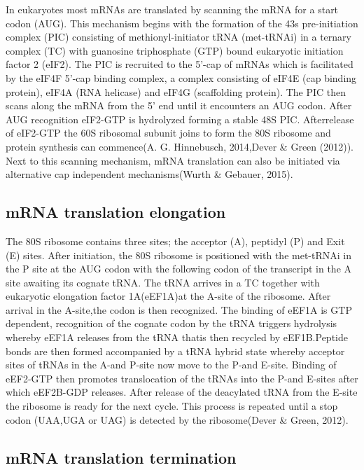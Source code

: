 \documentclass[12pt,openany]{book}
\begin{document}
In eukaryotes most mRNAs are translated by scanning the mRNA for a start
codon (AUG). This mechanism begins with the formation of the 43s
pre-initiation complex (PIC) consisting of methionyl-initiator tRNA
(met-tRNAi) in a ternary complex (TC) with guanosine triphosphate (GTP)
bound eukaryotic initiation factor 2 (eIF2). The PIC is recruited to the
5'-cap of mRNAs which is facilitated by the eIF4F 5'-cap binding
complex, a complex consisting of eIF4E (cap binding protein), eIF4A (RNA
helicase) and eIF4G (scaffolding protein). The PIC then scans along the
mRNA from the 5' end until it encounters an AUG codon. After AUG
recognition eIF2-GTP is hydrolyzed forming a stable 48S PIC.
Afterrelease of eIF2-GTP the 60S ribosomal subunit joins to form the 80S
ribosome and protein synthesis can commence(A. G. Hinnebusch, 2014,Dever
\& Green (2012)). Next to this scanning mechanism, mRNA translation can
also be initiated via alternative cap independent mechanisms(Wurth \&
Gebauer, 2015).

\subsection{mRNA translation elongation}

The 80S ribosome contains three sites; the acceptor (A), peptidyl (P)
and Exit (E) sites. After initiation, the 80S ribosome is positioned
with the met-tRNAi in the P site at the AUG codon with the following
codon of the transcript in the A site awaiting its cognate tRNA. The
tRNA arrives in a TC together with eukaryotic elongation factor
1A(eEF1A)at the A-site of the ribosome. After arrival in the A-site,the
codon is then recognized. The binding of eEF1A is GTP dependent,
recognition of the cognate codon by the tRNA triggers hydrolysis whereby
eEF1A releases from the tRNA thatis then recycled by eEF1B.Peptide bonds
are then formed accompanied by a tRNA hybrid state whereby acceptor
sites of tRNAs in the A-and P-site now move to the P-and E-site. Binding
of eEF2-GTP then promotes translocation of the tRNAs into the P-and
E-sites after which eEF2B-GDP releases. After release of the deacylated
tRNA from the E-site the ribosome is ready for the next cycle. This
process is repeated until a stop codon (UAA,UGA or UAG) is detected by
the ribosome(Dever \& Green, 2012).

\subsection{mRNA translation termination}
\end{document}
